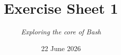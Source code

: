 




\title{{\vspace{-12mm}\huge\textbf{Exercise Sheet 1}}}
\author{\textit{Exploring the core of Bash}}
\date{{\small 22 June 2026}}


    \maketitle
    \bigskip
    
    \bigskip
    
    \bigskip
    
    \bigskip
    
    \bigskip
    
    \bigskip
    
    \bigskip
    
